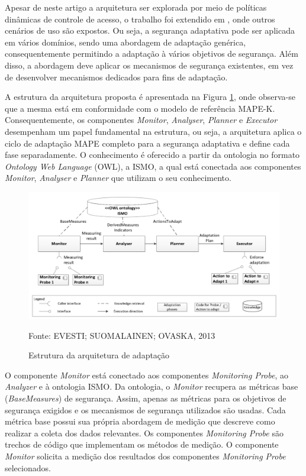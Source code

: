 \documentclass[tid,table]{texufpel} %
\begin{document}
Apesar de neste artigo a arquitetura ser explorada por meio de políticas dinâmicas de controle de acesso, o trabalho foi extendido em \cite{evesti13a}, onde outros cenários de uso são expostos. Ou seja, a segurança adaptativa pode ser aplicada em vários domínios, sendo uma abordagem de adaptação genérica, consequentemente permitindo a adaptação à vários objetivos de segurança. Além disso, a abordagem deve aplicar os mecanismos de segurança existentes, em vez de desenvolver mecanismos dedicados para fins de adaptação.

A estrutura da arquitetura proposta é apresentada na Figura \ref{ismo-architecture}, onde observa-se que a mesma está em conformidade com o modelo de referência MAPE-K. Consequentemente, os componentes \textit{Monitor}, \textit{Analyser}, \textit{Planner} e \textit{Executor} desempenham um papel fundamental na estrutura, ou seja, a arquitetura aplica o ciclo de adaptação MAPE completo para a segurança adaptativa e define cada fase separadamente. O conhecimento é oferecido a partir da ontologia no formato \textit{Ontology Web Language} (OWL), a ISMO, a qual está conectada aos componentes \textit{Monitor}, \textit{Analyser} e \textit{Planner} que utilizam o seu conhecimento.

\begin{figure}[ht]
\centering
\includegraphics[width=1\textwidth]{imagens/ismo-architecture.png}
\caption{Estrutura da arquitetura de adaptação}
\label{ismo-architecture}
Fonte: EVESTI; SUOMALAINEN; OVASKA, 2013\nocite{evesti13a}
\end{figure}

O componente \textit{Monitor} está conectado aos componentes \textit{Monitoring Probe}, ao \textit{Analyzer} e à ontologia ISMO. Da ontologia, o \textit{Monitor} recupera as métricas base (\textit{BaseMeasures}) de segurança. Assim, apenas as métricas para os objetivos de segurança exigidos e os mecanismos de segurança utilizados são usadas. Cada métrica base possui sua própria abordagem de medição que descreve como realizar a coleta dos dados relevantes. Os componentes \textit{Monitoring Probe} são trechos de código que implementam os métodos de medição. O componente \textit{Monitor} solicita a medição dos resultados dos componentes \textit{Monitoring Probe} selecionados.
\end{document}
